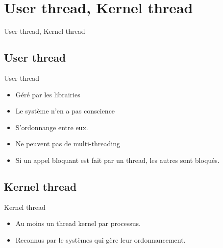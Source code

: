 \def\sectitle{User thread, Kernel thread}
\section{\sectitle}
\begin{frame}{\sectitle}
    \def\subsectitle{User thread}
    \subsection{\subsectitle}
    \begin{block}{\subsectitle}
        \begin{itemize}
            \item Géré par les librairies
            \item Le système n'en a pas conscience
            \item S'ordonnange entre eux.
            \item Ne peuvent pas de multi-threading
            \item Si un appel bloquant est fait par un thread, les autres sont
                bloqués.
        \end{itemize}
    \end{block}
    \def\subsectitle{Kernel thread}
    \subsection{\subsectitle}
    \begin{block}{\subsectitle}
        \begin{itemize}
            \item Au moins un thread kernel par processus.
            \item Reconnus par le systèmes qui gère leur ordonnancement.
        \end{itemize}
    \end{block}
\end{frame}


\def\sectitle{Modèles}
